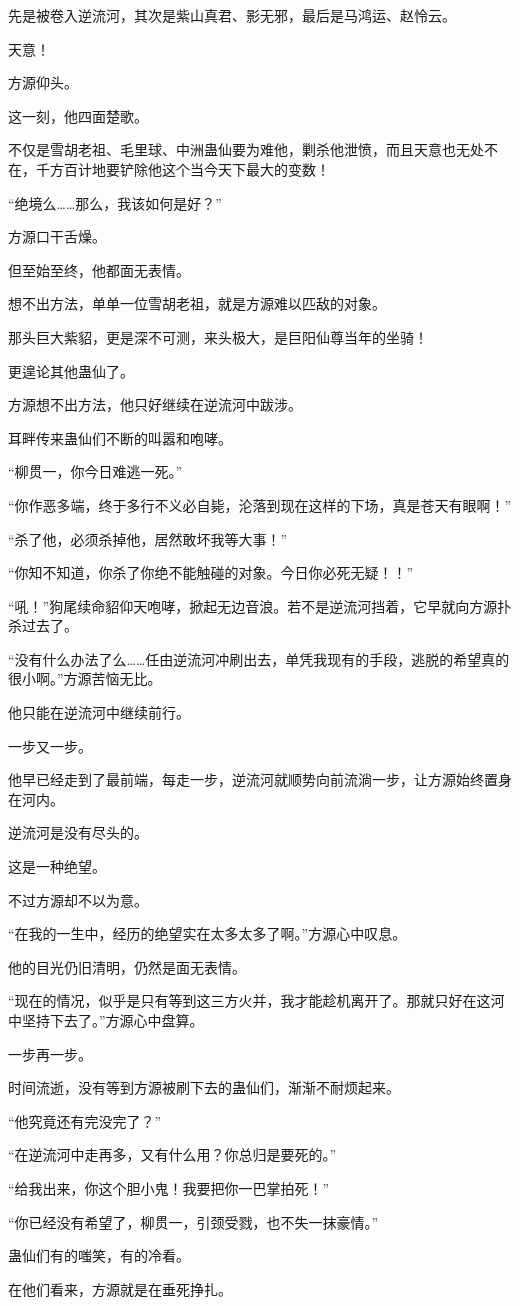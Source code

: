 \begin{this_body}
先是被卷入逆流河，其次是紫山真君、影无邪，最后是马鸿运、赵怜云。

天意！

方源仰头。

这一刻，他四面楚歌。

不仅是雪胡老祖、毛里球、中洲蛊仙要为难他，剿杀他泄愤，而且天意也无处不在，千方百计地要铲除他这个当今天下最大的变数！

“绝境么……那么，我该如何是好？”

方源口干舌燥。

但至始至终，他都面无表情。

想不出方法，单单一位雪胡老祖，就是方源难以匹敌的对象。

那头巨大紫貂，更是深不可测，来头极大，是巨阳仙尊当年的坐骑！

更遑论其他蛊仙了。

方源想不出方法，他只好继续在逆流河中跋涉。

耳畔传来蛊仙们不断的叫嚣和咆哮。

“柳贯一，你今日难逃一死。”

“你作恶多端，终于多行不义必自毙，沦落到现在这样的下场，真是苍天有眼啊！”

“杀了他，必须杀掉他，居然敢坏我等大事！”

“你知不知道，你杀了你绝不能触碰的对象。今日你必死无疑！！”

“吼！”狗尾续命貂仰天咆哮，掀起无边音浪。若不是逆流河挡着，它早就向方源扑杀过去了。

“没有什么办法了么……任由逆流河冲刷出去，单凭我现有的手段，逃脱的希望真的很小啊。”方源苦恼无比。

他只能在逆流河中继续前行。

一步又一步。

他早已经走到了最前端，每走一步，逆流河就顺势向前流淌一步，让方源始终置身在河内。

逆流河是没有尽头的。

这是一种绝望。

不过方源却不以为意。

“在我的一生中，经历的绝望实在太多太多了啊。”方源心中叹息。

他的目光仍旧清明，仍然是面无表情。

“现在的情况，似乎是只有等到这三方火并，我才能趁机离开了。那就只好在这河中坚持下去了。”方源心中盘算。

一步再一步。

时间流逝，没有等到方源被刷下去的蛊仙们，渐渐不耐烦起来。

“他究竟还有完没完了？”

“在逆流河中走再多，又有什么用？你总归是要死的。”

“给我出来，你这个胆小鬼！我要把你一巴掌拍死！”

“你已经没有希望了，柳贯一，引颈受戮，也不失一抹豪情。”

蛊仙们有的嗤笑，有的冷看。

在他们看来，方源就是在垂死挣扎。

\end{this_body}

